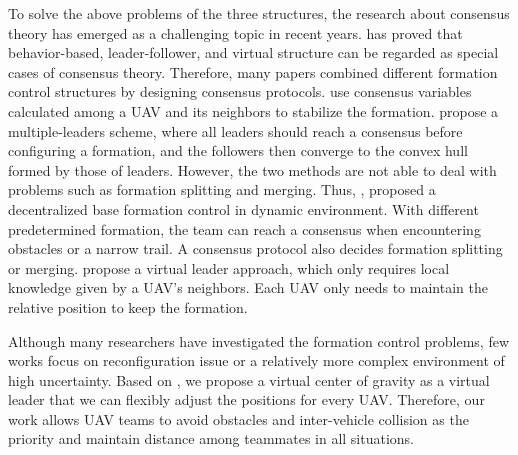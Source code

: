 To solve the above problems of the three structures, the research about consensus theory has emerged as a challenging topic in recent years. \citet{ren2007consensus} has proved that behavior-based, leader-follower, and virtual structure can be regarded as special cases of consensus theory. Therefore, many papers combined different formation control structures by designing consensus protocols. \citet{7419717} use consensus variables calculated among a UAV and its neighbors to stabilize the formation. \citet{8295262} propose a multiple-leaders scheme, where all leaders should reach a consensus before configuring a formation, and the followers then converge to the convex hull formed by those of leaders. However, the two methods are not able to deal with problems such as formation splitting and merging. Thus, \citet{7487747}, \citet{8793765} proposed a decentralized base formation control in dynamic environment. With different predetermined formation, the team can reach a consensus when encountering obstacles or a narrow trail. A consensus protocol also decides formation splitting or merging. \citet{5069925} propose a virtual leader approach, which only requires local knowledge given by a UAV's neighbors. Each UAV only needs to maintain the relative position to keep the formation.

Although many researchers have investigated the formation control problems, few works focus on reconfiguration issue or a relatively more complex environment of high uncertainty. Based on \citep{5069925}, we propose a virtual center of gravity as a virtual leader that we can flexibly adjust the positions for every UAV. Therefore, our work allows UAV teams to avoid obstacles and inter-vehicle collision as the priority and maintain distance among teammates in all situations.
